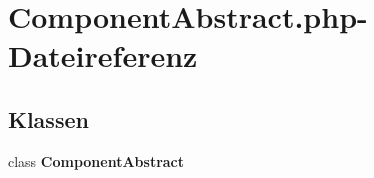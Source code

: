 \section{ComponentAbstract.php-Dateireferenz}
\label{ComponentAbstract_8php}
\subsection*{Klassen}
\begin{CompactItemize}
\item 
class {\bf ComponentAbstract}
\end{CompactItemize}
